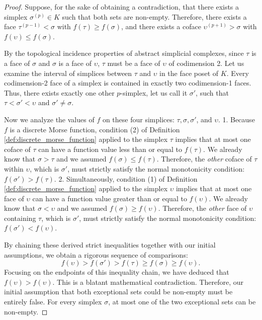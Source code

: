 \begin{proof}
Suppose, for the sake of obtaining a contradiction, that there exists a simplex $\sigma^{(p)} \in K$ such that both sets are non-empty. Therefore, there exists a face $\tau^{(p-1)} < \sigma$ with $f(\tau) \ge f(\sigma)$, and there exists a coface $\upsilon^{(p+1)} > \sigma$ with $f(\upsilon) \le f(\sigma)$.

By the topological incidence properties of abstract simplicial complexes, since $\tau$ is a face of $\sigma$ and $\sigma$ is a face of $\upsilon$, $\tau$ must be a face of $\upsilon$ of codimension 2. Let us examine the interval of simplices between $\tau$ and $\upsilon$ in the face poset of $K$. Every codimension-2 face of a simplex is contained in exactly two codimension-1 faces. Thus, there exists exactly one other $p$-simplex, let us call it $\sigma'$, such that $\tau < \sigma' < \upsilon$ and $\sigma' \neq \sigma$.

Now we analyze the values of $f$ on these four simplices: $\tau, \sigma, \sigma'$, and $\upsilon$.
1. Because $f$ is a discrete Morse function, condition (2) of Definition \ref{def:discrete_morse_function} applied to the simplex $\tau$ implies that at most one coface of $\tau$ can have a function value less than or equal to $f(\tau)$. We already know that $\sigma > \tau$ and we assumed $f(\sigma) \le f(\tau)$. Therefore, the \emph{other} coface of $\tau$ within $\upsilon$, which is $\sigma'$, must strictly satisfy the normal monotonicity condition: $f(\sigma') > f(\tau)$.
2. Simultaneously, condition (1) of Definition \ref{def:discrete_morse_function} applied to the simplex $\upsilon$ implies that at most one face of $\upsilon$ can have a function value greater than or equal to $f(\upsilon)$. We already know that $\sigma < \upsilon$ and we assumed $f(\sigma) \ge f(\upsilon)$. Therefore, the \emph{other} face of $\upsilon$ containing $\tau$, which is $\sigma'$, must strictly satisfy the normal monotonicity condition: $f(\sigma') < f(\upsilon)$.

By chaining these derived strict inequalities together with our initial assumptions, we obtain a rigorous sequence of comparisons:
\[ f(\upsilon) > f(\sigma') > f(\tau) \ge f(\sigma) \ge f(\upsilon). \]
Focusing on the endpoints of this inequality chain, we have deduced that $f(\upsilon) > f(\upsilon)$. This is a blatant mathematical contradiction. Therefore, our initial assumption that both exceptional sets could be non-empty must be entirely false. For every simplex $\sigma$, at most one of the two exceptional sets can be non-empty.
\end{proof}

